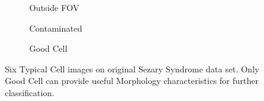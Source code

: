\begin{figure}[ht]
\begin{center}
\begin{subfigure}[b]{0.33\textwidth}
			\caption{Outside FOV}
			\label{fig:Outside FOV}
		\end{subfigure}
		\begin{subfigure}[b]{0.33\textwidth}
			\caption{Contaminated}
			\label{fig:Contaminated}
		\end{subfigure}
		\begin{subfigure}[b]{0.33\textwidth}
			\caption{Good Cell}
			\label{fig:Good Cell}
		\end{subfigure}
	\end{center}
	\caption{Six Typical Cell images on original Sezary Syndrome data set. Only Good Cell can provide useful Morphology characteristics for further classification.}
	\label{fig:lennas}
\end{figure}
